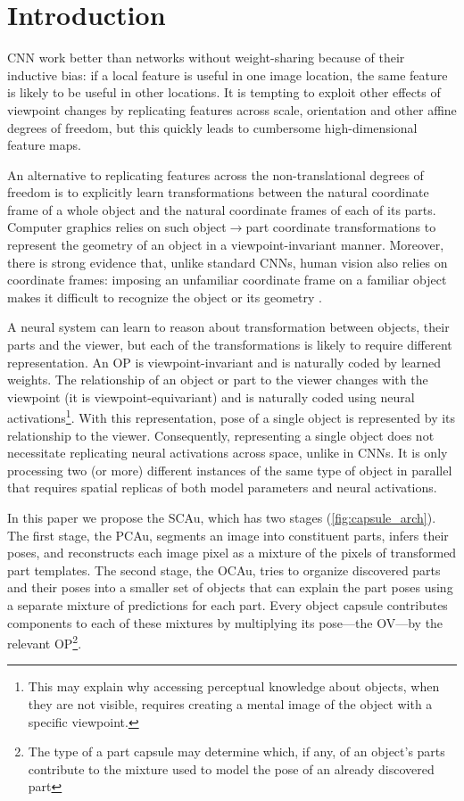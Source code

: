 \section{Introduction}
\Gls{CNN} work better than networks without weight-sharing because of their inductive bias: if a local feature is useful in one image location, the same feature is likely to be useful in other locations. It is tempting to exploit other effects of viewpoint changes by replicating features across scale, orientation and other affine degrees of freedom, but this quickly leads to cumbersome high-dimensional feature maps. %

An alternative to replicating features across the non-translational degrees of freedom is to explicitly learn transformations between the natural coordinate frame of a whole object and the natural coordinate frames of each of its parts.   Computer graphics relies on such object$\rightarrow$part coordinate transformations to represent the geometry of an object in a viewpoint-invariant manner. Moreover, there is strong evidence that, unlike standard \gls{CNN}s, human vision also relies on coordinate frames: imposing an unfamiliar coordinate frame on a familiar object makes it difficult to recognize the object or its geometry \citep{Rock73, Hinton79}.

A neural system can learn to reason about transformation between objects, their parts and the viewer, but each of the transformations is likely to require different representation.
An \gls{OP} is viewpoint-invariant and is naturally coded by learned weights.  
The relationship of an object or part to the viewer changes with the viewpoint (it is viewpoint-equivariant) and is naturally coded using neural activations\footnote{
    This may explain why accessing perceptual knowledge about objects, when they are not visible, requires creating a mental image of the object with a specific viewpoint.
}.
With this representation, pose of a single object is represented by its relationship to the viewer.
Consequently, representing a single object does not necessitate replicating neural activations across space, unlike in \glspl{CNN}.
It is only processing two (or more) different instances of the same type of object in parallel that requires spatial replicas of both model parameters and neural activations.

In this paper we propose the \gls{SCAu}, which has two stages (\cref{fig:capsule_arch}). The first stage, the \gls{PCAu}, segments an image into constituent parts, infers their poses, and reconstructs each image pixel as a mixture of the pixels of transformed part templates.
The second stage, the \gls{OCAu}, tries to organize discovered parts and their poses into a smaller set of objects that can explain the part poses using a separate mixture of predictions for each part. 
Every object capsule contributes components to each of these mixtures by multiplying its pose---the \gls{OV}---by the relevant \gls{OP}\footnote{The type of a part capsule may determine which, if any, of an object's parts contribute to the mixture used to model the pose of an already discovered part}.

